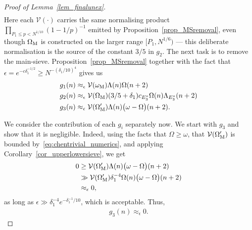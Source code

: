 \documentclass[12pt]{amsart}
\theoremstyle{definition}
\theoremstyle{remark}
\numberwithin{equation}{section}
\newcommand{\1}{\mathbf{1}}
\begin{document}
\begin{proof}[Proof of Lemma~\ref{lem_finalunex}]
\begin{align*}
    \end{align*}
    Here each $\mathcal{V}(\cdot)$ carries the same normalising product $\prod_{P_1\le p<N^{1/10}}(1-1/p)^{-1}$ emitted by Proposition~\ref{prop_MSremoval}, even though $\Omega_{\textup{M}}$ is constructed on the larger range $[P_1,N^{1/6})$ --- this deliberate normalisation is the source of the constant $3/5$ in $g_2$.
       The next task is to remove the main-sieve. Proposition~\ref{prop_MSremoval} together with the fact that $\epsilon=e^{-c \delta_1^{-1/2}}\geq N^{-(\delta_1/10)^4}$ gives us
        \begin{align*}
            g_1(n)&\approx_\epsilon  \mathcal{V}(\omega_{\textup{M}}) \Lambda(n)\Omega(n+2) \\
            g_2(n)&\approx_\epsilon \mathcal{V}(\Omega_{\textup{M}})(3/5+\delta_1)c_{E_3^*}\Omega(n)\Lambda_{E_3^*}(n+2)\\
            g_3(n)&\approx_\epsilon \mathcal{V}(\Omega'_{\textup{M}}) \Lambda(n)\bigl(\omega -\Omega\bigr)(n+2).
        \end{align*}

    We consider the contribution of each $g_i$ separately now. We start with $g_3$ and show that it is negligible. Indeed, using the facts that $\Omega\geq \omega $, that $\mathcal{V}(\Omega'_{\textup{M}})$ is bounded by~\eqref{eq:chentrivial_numerics}, and applying Corollary~\ref{cor_upperlowersieve}, we get
    \begin{align*}
        0&\geq \mathcal{V}(\Omega'_{\textup{M}}) \Lambda(n)\bigl(\omega -\Omega\bigr)(n+2)  \\
        & \gg \mathcal{V}(\Omega'_{\textup{M}}) \delta_1^{-4} \Omega(n)\bigl(\omega -\Omega\bigr)(n+2)\\
        &\approx_{\epsilon}0,
    \end{align*}
    as long as $\epsilon\gg \delta_1^{-4} e^{-\delta_1^{-1}/10} $, which is acceptable. Thus,
    \begin{align}\label{eq_finalproof_2}
        g_3(n)\approx_{\epsilon}0.
    \end{align}


\end{proof}
\end{document}
